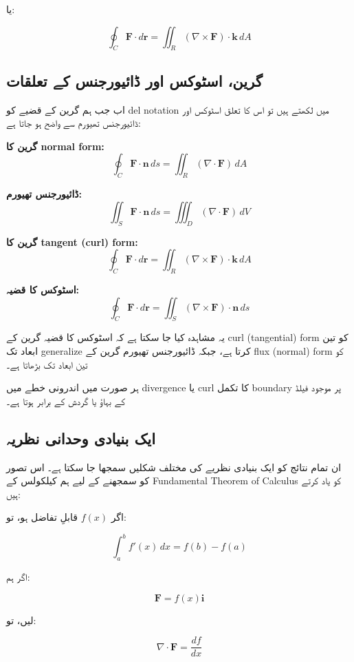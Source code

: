 \begin{enumerate}
یا:

\[
\oint_C \mathbf{F}\cdot d\mathbf{r}
=
\iint_R (\nabla \times \mathbf{F})\cdot \mathbf{k}\, dA
\]

\bigskip

\subsection*{گرین، اسٹوکس اور ڈائیورجنس کے تعلقات}

اب جب ہم گرین کے قضیے کو del notation میں لکھتے ہیں تو اس کا تعلق اسٹوکس اور ڈائیورجنس تھیورم سے واضح ہو جاتا ہے:

\bigskip

\textbf{گرین کا normal form:}
\[
\oint_C \mathbf{F}\cdot \mathbf{n}\, ds
=
\iint_R (\nabla \cdot \mathbf{F})\, dA
\]

\textbf{ڈائیورجنس تھیورم:}
\[
\iint_S \mathbf{F}\cdot \mathbf{n}\, ds
=
\iiint_D (\nabla \cdot \mathbf{F})\, dV
\]

\textbf{گرین کا tangent (curl) form:}
\[
\oint_C \mathbf{F}\cdot d\mathbf{r}
=
\iint_R (\nabla \times \mathbf{F})\cdot \mathbf{k}\, dA
\]

\textbf{اسٹوکس کا قضیہ:}
\[
\oint_C \mathbf{F}\cdot d\mathbf{r}
=
\iint_S (\nabla \times \mathbf{F})\cdot \mathbf{n}\, ds
\]

\bigskip

یہ مشاہدہ کیا جا سکتا ہے کہ اسٹوکس کا قضیہ گرین کے curl (tangential) form کو تین ابعاد تک generalize کرتا ہے، جبکہ ڈائیورجنس تھیورم گرین کے flux (normal) form کو تین ابعاد تک بڑھاتا ہے۔

ہر صورت میں اندرونی خطے میں divergence یا curl کا تکمل boundary پر موجود فیلڈ کے بہاؤ یا گردش کے برابر ہوتا ہے۔

\bigskip

\subsection*{ایک بنیادی وحدانی نظریہ}

ان تمام نتائج کو ایک بنیادی نظریے کی مختلف شکلیں سمجھا جا سکتا ہے۔ اس تصور کو سمجھنے کے لیے ہم کیلکولس کے Fundamental Theorem of Calculus کو یاد کرتے ہیں:

اگر \( f(x) \) قابلِ تفاضل ہو، تو:

\[
\int_a^b f'(x)\, dx = f(b) - f(a)
\]

اگر ہم:

\[
\mathbf{F} = f(x)\mathbf{i}
\]

لیں، تو:

\[
\nabla \cdot \mathbf{F} = \frac{df}{dx}
\]


\end{enumerate}
